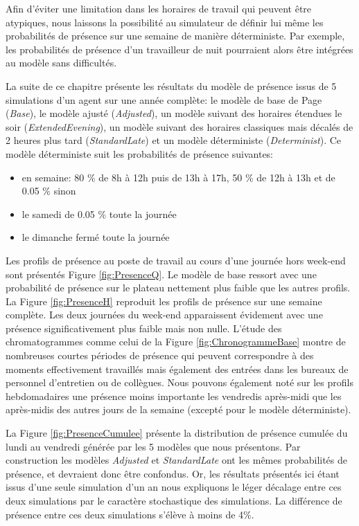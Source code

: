 Afin d'éviter une limitation dans les horaires de travail qui peuvent être atypiques, nous laissons la possibilité au simulateur de définir lui même les probabilités de présence sur une semaine de manière déterministe. Par exemple, les probabilités de présence d'un travailleur de nuit pourraient alors être intégrées au modèle sans difficultés.

La suite de ce chapitre présente les résultats du modèle de présence issus de 5 simulations d'un agent sur une année complète: le modèle de base de Page (\textit{Base}), le modèle ajusté (\textit{Adjusted}), un modèle suivant des horaires étendues le soir (\textit{ExtendedEvening}), un modèle suivant des horaires classiques mais décalés de 2 heures plus tard (\textit{StandardLate}) et un modèle déterministe (\textit{Determinist}). Ce modèle déterministe suit les probabilités de présence suivantes:
\begin{itemize}
\item en semaine: 80 \% de 8h à 12h puis de 13h à 17h,  50 \% de 12h à 13h et de 0.05 \% sinon
\item le samedi de 0.05 \% toute la journée
\item le dimanche fermé toute la journée
\end{itemize}

Les profils de présence au poste de travail au cours d'une journée hors week-end sont présentés Figure \ref{fig:PresenceQ}. Le modèle de base ressort avec une probabilité de présence sur le plateau nettement plus faible que les autres profils. La Figure \ref{fig:PresenceH} reproduit les profils de présence sur une semaine complète. Les deux journées du week-end apparaissent évidement avec une présence significativement plus faible mais non nulle. L'étude des chromatogrammes comme celui de la Figure \ref{fig:ChronogrammeBase} montre de nombreuses courtes périodes de présence qui peuvent correspondre à des moments effectivement travaillés mais également des entrées dans les bureaux de personnel d'entretien ou de collègues. Nous pouvons également noté sur les profils hebdomadaires une présence moins importante les vendredis après-midi que les après-midis des autres jours de la semaine (excepté pour le modèle déterministe).

La Figure \ref{fig:PresenceCumulee} présente la distribution de présence cumulée du lundi au vendredi générée par les 5 modèles que nous présentons. Par construction les modèles \textit{Adjusted} et \textit{StandardLate} ont les mêmes probabilités de présence, et devraient donc être confondus. Or, les résultats présentés ici étant issus d'une seule simulation d'un an nous expliquons le léger décalage entre ces deux simulations par le caractère stochastique des simulations. La différence de présence entre ces deux simulations s'élève à moins de 4\%.  

